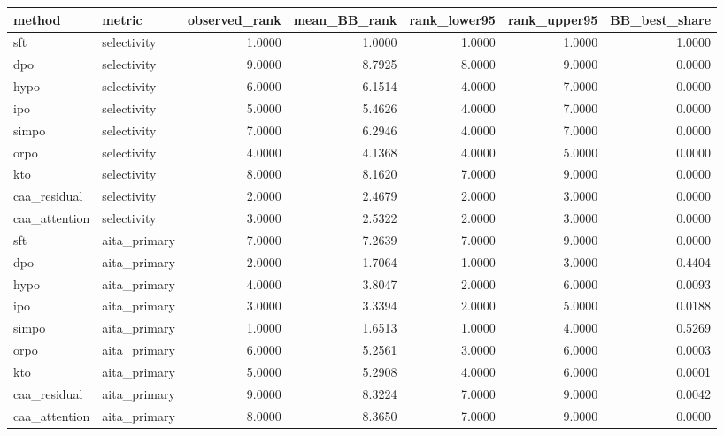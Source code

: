 \begin{tabular}{llrrrrr}
\toprule
method & metric & observed\_rank & mean\_BB\_rank & rank\_lower95 & rank\_upper95 & BB\_best\_share \\
\midrule
sft & selectivity & 1.0000 & 1.0000 & 1.0000 & 1.0000 & 1.0000 \\
dpo & selectivity & 9.0000 & 8.7925 & 8.0000 & 9.0000 & 0.0000 \\
hypo & selectivity & 6.0000 & 6.1514 & 4.0000 & 7.0000 & 0.0000 \\
ipo & selectivity & 5.0000 & 5.4626 & 4.0000 & 7.0000 & 0.0000 \\
simpo & selectivity & 7.0000 & 6.2946 & 4.0000 & 7.0000 & 0.0000 \\
orpo & selectivity & 4.0000 & 4.1368 & 4.0000 & 5.0000 & 0.0000 \\
kto & selectivity & 8.0000 & 8.1620 & 7.0000 & 9.0000 & 0.0000 \\
caa\_residual & selectivity & 2.0000 & 2.4679 & 2.0000 & 3.0000 & 0.0000 \\
caa\_attention & selectivity & 3.0000 & 2.5322 & 2.0000 & 3.0000 & 0.0000 \\
sft & aita\_primary & 7.0000 & 7.2639 & 7.0000 & 9.0000 & 0.0000 \\
dpo & aita\_primary & 2.0000 & 1.7064 & 1.0000 & 3.0000 & 0.4404 \\
hypo & aita\_primary & 4.0000 & 3.8047 & 2.0000 & 6.0000 & 0.0093 \\
ipo & aita\_primary & 3.0000 & 3.3394 & 2.0000 & 5.0000 & 0.0188 \\
simpo & aita\_primary & 1.0000 & 1.6513 & 1.0000 & 4.0000 & 0.5269 \\
orpo & aita\_primary & 6.0000 & 5.2561 & 3.0000 & 6.0000 & 0.0003 \\
kto & aita\_primary & 5.0000 & 5.2908 & 4.0000 & 6.0000 & 0.0001 \\
caa\_residual & aita\_primary & 9.0000 & 8.3224 & 7.0000 & 9.0000 & 0.0042 \\
caa\_attention & aita\_primary & 8.0000 & 8.3650 & 7.0000 & 9.0000 & 0.0000 \\
\bottomrule
\end{tabular}
